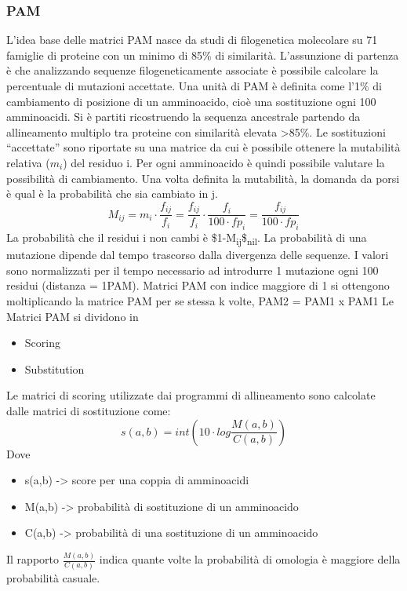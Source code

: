 \documentclass[11pt]{article}
\begin{document}
\subsubsection{PAM}
\label{sec:org197de09}
L'idea base delle matrici PAM nasce da studi di filogenetica molecolare su 71 famiglie di proteine con un minimo di 85\% di similarità. L'assunzione di partenza è che analizzando sequenze filogeneticamente associate è possibile calcolare la percentuale di mutazioni accettate. Una unità di PAM è definita come l'1\% di cambiamento di posizione di un amminoacido, cioè una sostituzione ogni 100 amminoacidi.
Si è partiti ricostruendo la sequenza ancestrale partendo da allineamento multiplo tra proteine con similarità elevata >85\%.
Le sostituzioni ``accettate'' sono riportate su una matrice da cui è possibile ottenere la mutabilità relativa (\(m_i\)) del residuo i.
Per ogni amminoacido è quindi possibile valutare la possibilità di cambiamento.
Una volta definita la mutabilità, la domanda da porsi è qual è la probabilità che sia cambiato in j.
$$M_{ij} = m_i \cdot \frac{f_{ij}}{f_i} = \frac{f_{ij}}{f_i} \cdot \frac{f_i}{100 \cdot fp_i} = \frac{f_{ij}}{100 \cdot fp_i}$$
La probabilità che il residui i non cambi è \$1-M\textsubscript{ij}\$\textsubscript{nil}.
La probabilità di una mutazione dipende dal tempo trascorso dalla divergenza delle sequenze. I valori sono normalizzati per il tempo necessario ad introdurre 1 mutazione ogni 100 residui (distanza = 1PAM).
Matrici PAM con indice maggiore di 1 si ottengono moltiplicando la matrice PAM per se stessa k volte, PAM2 = PAM1 x PAM1
Le Matrici PAM si dividono in
\begin{itemize}
\item Scoring
\item Substitution
\end{itemize}
Le matrici di scoring utilizzate dai programmi di allineamento sono calcolate dalle matrici di sostituzione come:
$$s(a,b) = int(10\cdot log{\frac{M(a,b)} {C(a,b)}})$$
Dove
\begin{itemize}
\item s(a,b) -> score per una coppia di amminoacidi
\item M(a,b) -> probabilità di sostituzione di un amminoacido
\item C(a,b) -> probabilità di una sostituzione di un amminoacido
\end{itemize}
Il rapporto \(\frac{M(a,b)}{C(a,b)}\)  indica quante volte la probabilità di omologia è maggiore della probabilità casuale.
\end{document}

